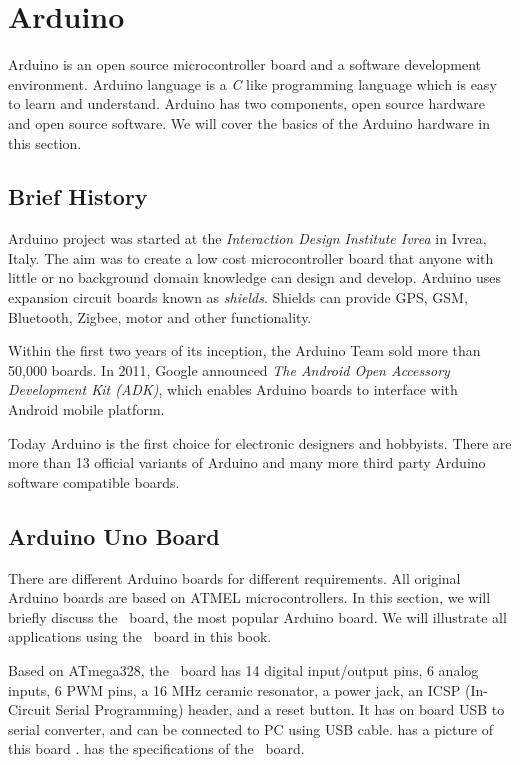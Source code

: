 \section {Arduino}
Arduino is an open source microcontroller board and a software
development environment. Arduino language is a \emph{C} like
programming language which is easy to learn and understand.  Arduino
has two components, open source hardware and open source software.  We
will cover the basics of the Arduino hardware in this section.

\subsection{Brief History}
Arduino project was started at the \emph{Interaction Design Institute
  Ivrea} in Ivrea, Italy. The aim was to create a low cost
microcontroller board that anyone with little or no background domain
knowledge can design and develop. Arduino uses expansion circuit
boards known as \emph{shields}. Shields can provide GPS, GSM,
Bluetooth, Zigbee, motor and other functionality.

Within the first two years of its inception, the Arduino Team sold
more than 50,000 boards. In 2011, Google announced \emph{The Android
Open Accessory Development Kit (ADK)}, which enables Arduino boards to
interface with Android mobile platform.

Today Arduino is the first choice for electronic designers and
hobbyists. There are  more than 13 official variants of Arduino and
many more third party Arduino software compatible boards.  

\subsection{Arduino Uno Board}
There are different Arduino boards for different requirements. All
original Arduino boards are based on ATMEL microcontrollers.  In this
section, we will briefly discuss the \arduino\ board, the most popular
Arduino board.  We will illustrate all applications using the
\arduino\ board in this book.

Based on ATmega328, the \arduino\ board has 14 digital input/output
pins, 6 analog inputs, 6 PWM pins, a 16 MHz ceramic resonator, a power
jack, an ICSP (In-Circuit Serial Programming) header, and a reset
button. It has on board USB to serial converter, and can be connected
to PC using USB cable.   has a picture of this board
\cite{uno-ref}.   has the specifications of the
\arduino\ board.

